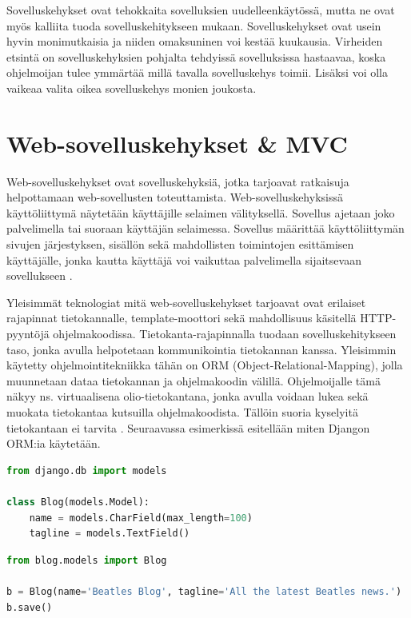 \documentclass[utf8]{gradu3}
\begin{document}
Sovelluskehykset ovat tehokkaita sovelluksien uudelleenkäytössä, mutta ne ovat myös kalliita tuoda sovelluskehitykseen mukaan. Sovelluskehykset ovat usein hyvin monimutkaisia ja niiden omaksuninen voi kestää kuukausia. Virheiden etsintä on sovelluskehyksien pohjalta tehdyissä sovelluksissa hastaavaa, koska ohjelmoijan tulee ymmärtää millä tavalla sovelluskehys toimii. Lisäksi voi olla vaikeaa valita oikea sovelluskehys monien joukosta. 

\chapter{Web-sovelluskehykset \& MVC}
Web-sovelluskehykset ovat sovelluskehyksiä, jotka tarjoavat ratkaisuja helpottamaan web-sovellusten toteuttamista. Web-sovelluskehyksissä käyttöliittymä näytetään käyttäjille selaimen välityksellä. Sovellus ajetaan joko palvelimella tai suoraan käyttäjän selaimessa. Sovellus määrittää käyttöliittymän sivujen järjestyksen, sisällön sekä mahdollisten toimintojen esittämisen käyttäjälle, jonka kautta käyttäjä voi vaikuttaa palvelimella sijaitsevaan sovellukseen \parencite{vosloo}. 

Yleisimmät teknologiat mitä web-sovelluskehykset tarjoavat ovat erilaiset rajapinnat tietokannalle, template-moottori sekä mahdollisuus käsitellä HTTP-pyyntöjä ohjelmakoodissa. Tietokanta-rajapinnalla tuodaan sovelluskehitykseen taso, jonka avulla helpotetaan kommunikointia tietokannan kanssa. Yleisimmin käytetty ohjelmointitekniikka tähän on ORM (Object-Relational-Mapping), jolla muunnetaan dataa tietokannan ja ohjelmakoodin välillä. Ohjelmoijalle tämä näkyy ns. virtuaalisena olio-tietokantana, jonka avulla voidaan lukea sekä muokata tietokantaa kutsuilla ohjelmakoodista. Tällöin suoria kyselyitä tietokantaan ei tarvita \parencite{Ghandeharizadeh}. Seuraavassa esimerkissä esitellään miten Djangon ORM:ia käytetään.

\begin{lstlisting}[language=Python]
from django.db import models

class Blog(models.Model):
    name = models.CharField(max_length=100)
    tagline = models.TextField()
\end{lstlisting}

\begin{lstlisting}[language=Python]
from blog.models import Blog

b = Blog(name='Beatles Blog', tagline='All the latest Beatles news.')
b.save()
\end{lstlisting}
\end{document}

